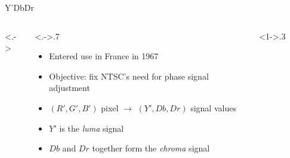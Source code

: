 \documentclass[aspectratio=169,handout,usepdftitle=false]{fireshonks}
\begin{document}
\begin{frame}{Y'DbDr}
    \begin{columns}<.->
        \begin{column}<.->{.7\textwidth}
            \begin{itemize}
                \item Entered use in France in 1967
                \item Objective: fix NTSC's need for phase signal adjustment
                \item $(R', G', B')$ pixel $\rightarrow$ $(Y', Db, Dr)$ signal values
                \item $Y'$ is the \emph{luma} signal
                \item $Db$ and $Dr$ together form the \emph{chroma} signal
            \end{itemize}
        \end{column}
        \begin{column}<1->{.3\textwidth}
            \begin{figure}

\end{figure}
\end{column}
\end{columns}
\end{frame}
\end{document}
